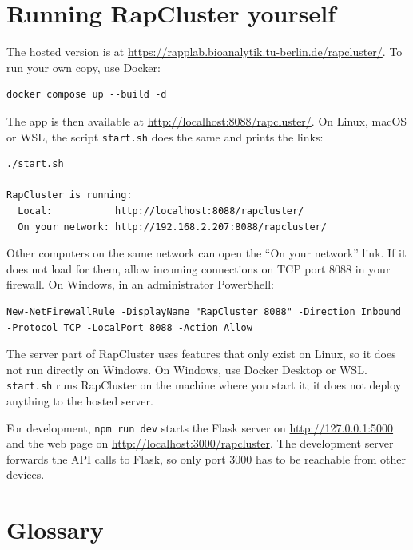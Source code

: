 \documentclass[11pt,a4paper]{article}
\begin{document}
\section{Running RapCluster yourself}

The hosted version is at \url{https://rapplab.bioanalytik.tu-berlin.de/rapcluster/}. To run your own copy, use
Docker:

\begin{lstlisting}
docker compose up --build -d
\end{lstlisting}

The app is then available at \url{http://localhost:8088/rapcluster/}. On Linux, macOS or WSL, the script
\texttt{start.sh} does the same and prints the links:

\begin{lstlisting}
./start.sh

RapCluster is running:
  Local:           http://localhost:8088/rapcluster/
  On your network: http://192.168.2.207:8088/rapcluster/
\end{lstlisting}

Other computers on the same network can open the ``On your network'' link. If it does not load for them, allow
incoming connections on TCP port 8088 in your firewall. On Windows, in an administrator PowerShell:

\begin{lstlisting}
New-NetFirewallRule -DisplayName "RapCluster 8088" -Direction Inbound -Protocol TCP -LocalPort 8088 -Action Allow
\end{lstlisting}

\begin{note}
The server part of RapCluster uses features that only exist on Linux, so it does not run directly on Windows. On
Windows, use Docker Desktop or WSL. \texttt{start.sh} runs RapCluster on the machine where you start it; it does
not deploy anything to the hosted server.
\end{note}

For development, \texttt{npm run dev} starts the Flask server on \url{http://127.0.0.1:5000} and the web page on
\url{http://localhost:3000/rapcluster}. The development server forwards the API calls to Flask, so only port 3000
has to be reachable from other devices.

\section*{Glossary}
\end{document}
